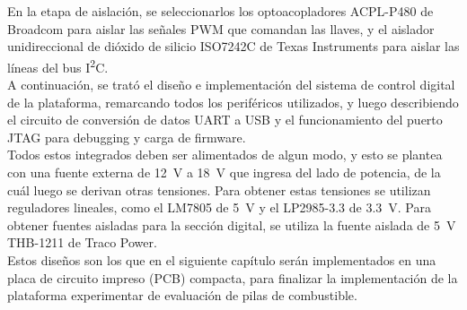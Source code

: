 En la etapa de aislación, se seleccionarlos los optoacopladores {\Medium ACPL-P480 de Broadcom} para aislar las señales PWM que comandan las llaves, y el aislador unidireccional de dióxido de silicio {\Medium ISO7242C de Texas Instruments} para aislar las líneas del bus I\textsuperscript{2}C.\\

A continuación, se trató el diseño e implementación del sistema de control digital de la plataforma, remarcando todos los periféricos utilizados, y luego describiendo el circuito de conversión de datos UART a USB y el funcionamiento del puerto JTAG para debugging y carga de firmware.\\

Todos estos integrados deben ser alimentados de algun modo, y esto se plantea con una fuente externa de \SI[]{12}{\volt} a \SI[]{18}{\volt} que ingresa del lado de potencia, de la cuál luego se derivan otras tensiones. Para obtener estas tensiones se utilizan reguladores lineales, como el {\Medium LM7805} de \SI{5}{\volt} y el {\Medium LP2985-3.3} de \SI[]{3.3}{\volt}. Para obtener fuentes aisladas para la sección digital, se utiliza la fuente aislada de \SI[]{5}{\volt} {\Medium THB-1211 de Traco Power}.\\

Estos diseños son los que en el siguiente capítulo serán implementados en una placa de circuito impreso (PCB) compacta, para finalizar la implementación de la plataforma experimentar de evaluación de pilas de combustible.\\